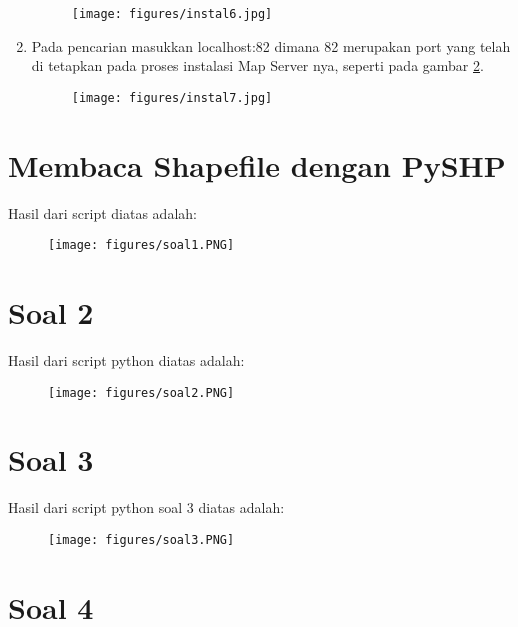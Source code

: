 \begin{enumerate}
    \begin{figure}[!htbp]
    \centering
    \texttt{[image: figures/instal6.jpg]}
    \label{instal6}
\end{figure}    
    \item Pada pencarian masukkan localhost:82 dimana 82 merupakan port yang telah di tetapkan pada proses instalasi Map Server nya, seperti pada gambar \ref{instal7}. 
    \begin{figure}[!htbp]
    \centering
    \texttt{[image: figures/instal7.jpg]}
    \label{instal7}
\end{figure}  

\end{enumerate}

\section{Membaca Shapefile dengan PySHP}

\par Hasil dari script diatas adalah: 
\begin{figure}[!htbp]
    \centering
    \texttt{[image: figures/soal1.PNG]}
    \label{soal1}
\end{figure}

\section{Soal 2}


\par Hasil dari script python diatas adalah:
\begin{figure}[!htbp]
    \centering
    \texttt{[image: figures/soal2.PNG]}
    \label{soal2}
\end{figure}

\section{Soal 3}

\par Hasil dari script python soal 3 diatas adalah: 
\begin{figure}[!htbp]
    \centering
    \texttt{[image: figures/soal3.PNG]}
    \label{soal3}
\end{figure}

\section{Soal 4}


